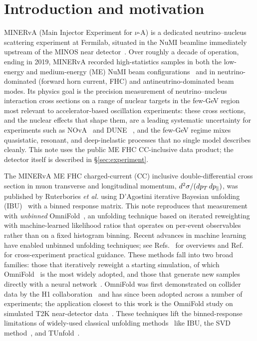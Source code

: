 \section{Introduction and motivation}
\label{sec:intro}



MINERvA (Main Injector Experiment for $\nu$-A) is a dedicated neutrino--nucleus scattering experiment at Fermilab, situated in the NuMI beamline immediately upstream of the MINOS near detector~\cite{MINERvA:2013zvz}. Over roughly a decade of operation, ending in 2019, MINERvA recorded high-statistics samples in both the low-energy and medium-energy (ME) NuMI beam configurations~\cite{MINERvA:2016iqn} and in neutrino-dominated (forward horn current, FHC) and antineutrino-dominated beam modes. Its physics goal is the precision measurement of neutrino--nucleus interaction cross sections on a range of nuclear targets in the few-GeV region most relevant to accelerator-based oscillation experiments: these cross sections, and the nuclear effects that shape them, are a leading systematic uncertainty for experiments such as NOvA~\cite{NOvA:2021nfi} and DUNE~\cite{DUNE:2020jqi} , and the few-GeV regime mixes quasistatic, resonant, and deep-inelastic processes that no single model describes cleanly. This note uses the public ME FHC CC-inclusive data product; the detector itself is described in \S\ref{sec:experiment}.

The MINERvA ME FHC charged-current (CC) inclusive
double-differential cross section in muon transverse and longitudinal momentum,
$d^{2}\sigma/(dp_{T}\,dp_{\parallel})$, was published by Ruterbories \emph{et al.}
\cite{MINERvA:2021owq} using D'Agostini iterative Bayesian unfolding
(IBU)~\cite{DAgostini:1994fjx} with a binned response matrix. This note reproduces
that measurement with \emph{unbinned} OmniFold~\cite{Andreassen:2019cjw,
Andreassen:2021zzk}, an unfolding technique based on iterated reweighting with
machine-learned likelihood ratios that operates on per-event observables rather
than on a fixed histogram binning. Recent advances in machine learning have enabled unbinned unfolding
techniques; see Refs.~\cite{Arratia:2021otl,Huetsch:2024quz} for overviews
and Ref.~\cite{unbinnedguide} for cross-experiment practical
guidance. These methods fall into two broad families: those that
iteratively reweight a starting simulation, of which
OmniFold~\cite{Andreassen:2019cjw,Andreassen:2021zzk,Chan:2023tbf} is the
most widely adopted, and those that generate new samples directly with a
neural network~\cite{Datta:2018mwd,Bellagente:2019uyp,Bellagente:2020piv,
Backes:2022vmn}. OmniFold was first demonstrated on collider data by the H1
collaboration~\cite{H1:2021wkz,H1:2023fzk} and has since been adopted across
a number of experiments; the application closest to this work is the
OmniFold study on simulated T2K near-detector data~\cite{Huang:2024omnifold}.
These techniques lift the binned-response limitations of widely-used
classical unfolding methods~\cite{Adye:2011gm} like IBU, the SVD
method~\cite{Hocker:1995kb}, and TUnfold~\cite{Schmitt:2012kp}. 



